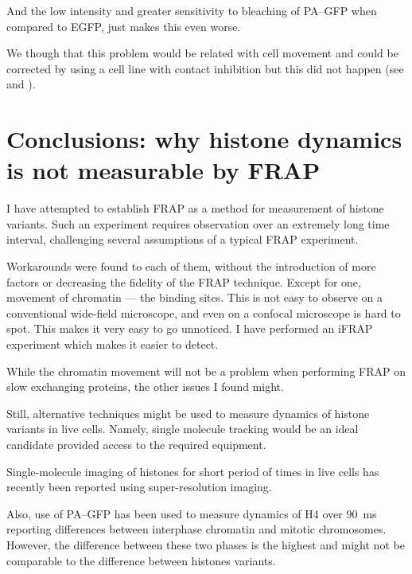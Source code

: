   And the low intensity and greater sensitivity to bleaching of PA--GFP when compared to EGFP, just makes this
  even worse.
  
  We though that this problem would be related with cell movement and could be
  corrected by using a cell line with contact inhibition but this did not happen (see  and
  ).


\section{Conclusions: why histone dynamics is not measurable by FRAP}
  
  I have attempted to establish FRAP as a method for measurement of histone variants. Such
  an experiment requires observation over an extremely long time interval, challenging several
  assumptions of a typical FRAP experiment.
  
  Workarounds were found to each of them, without the introduction of more factors or decreasing
  the fidelity of the FRAP technique. Except for one, movement of chromatin --- the binding sites.
  This is not easy to observe on a conventional wide-field microscope, and even on a confocal
  microscope is hard to spot. This makes it very easy to go unnoticed. I have performed an iFRAP
  experiment which makes it easier to detect.
  
  While the chromatin movement will not be a problem when performing FRAP on slow exchanging
  proteins, the other issues I found might.
  
  
  Still, alternative techniques might be used to measure dynamics of histone variants in
  live cells. Namely, single molecule tracking would be an ideal candidate provided access
  to the required equipment.
  
  
  Single-molecule imaging of histones for short period of times in live cells
  has recently been reported using super-resolution imaging.
   
  Also, use of PA--GFP has been used to measure dynamics of H4 over \SI{90}{\ms} reporting
  differences between interphase chromatin and mitotic chromosomes.
  However, the difference between these two phases is the highest and might not be comparable to
  the difference between histones variants.
  

